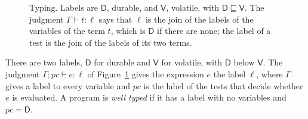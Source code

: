 \documentclass[acmsmall,nonacm,screen]{acmart}
\newcommand{\kw}[1]{\mathsf{#1}}
\newcommand{\letin}[3]{\kw{let}\;#1 = #2\;\kw{in}\;#3}
\newcommand{\ite}[3]{\kw{if}\;#1\;\kw{then}\;#2\;\kw{else}\;#3}
\newcommand{\once}[5]{\kw{once}\;#1(#2)\;\kw{as}\;#3\;\kw{then}\;#4\;\kw{else}\;#5}
\newcommand{\gate}[3]{\kw{gate}\;#1\;\kw{then}\;#2\;\kw{else}\;#3}
\newcommand{\iter}[4]{\kw{iter}\;#1\;\kw{from}\;#2\;\kw{as}\;#3.\,#4}
\newcommand{\D}{\mathsf{D}}
\newcommand{\Vl}{\mathsf{V}}
\newcommand{\rd}{\kw{read}}
\newcommand{\idem}{\kw{idem}}
\begin{document}
\begin{figure}[t]
\caption{Typing. Labels are $\D$, durable, and $\Vl$, volatile, with
$\D \sqsubseteq \Vl$. The judgment $\Gamma \vdash t : \ell$ says that $\ell$ is the join of the
labels of the variables of the term $t$, which is $\D$ if there are none; the label of a test
is the join of the labels of its two terms.}
\label{fig:typing}
\end{figure}

There are two labels, $\D$ for durable and $\Vl$ for volatile, with $\D$ below $\Vl$. The
judgment $\Gamma; pc \vdash e : \ell$ of Figure~\ref{fig:typing} gives the expression $e$ the
label $\ell$, where $\Gamma$ gives a label to every variable and $pc$ is the label of the
tests that decide whether $e$ is evaluated. A program is \emph{well typed} if it has a label
with no variables and $pc = \D$.
\end{document}
